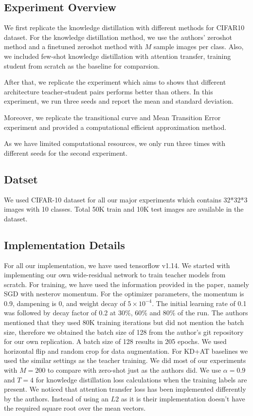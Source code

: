 \documentclass{article}
\begin{document}
\subsection{Experiment Overview}
We first replicate the knowledge distillation with different methods for CIFAR10 dataset. For the knowledge distillation method, we use the authors' zeroshot method and a finetuned zeroshot method with $M$ sample images per class. Also, we included few-shot knowledge distillation with attention transfer, training student from scratch as the baseline for comparsion.

After that, we replicate the experiment which aims to shows that different architecture teacher-student pairs performs better than others. In this experiment, we run three seeds and report the mean and standard deviation.

Moreover, we replicate the transitional curve and Mean Transition Error experiment and provided a computational efficient approximation method.

As we have limited computational resources, we only run three times with different seeds for the second experiment.

\subsection{Datset}

We used CIFAR-10 \cite{cifar10} dataset for all our major experiments which contains 32*32*3 images with 10 classes. Total 50K train and 10K test images are available in the dataset.

\subsection{Implementation Details}

For all our implementation, we have used tensorflow v1.14. We started with implementing our own wide-residual network \cite{zagoruyko2016wide} to train teacher models from scratch. For training, we have used the information provided in the paper, namely SGD with nesterov momentum. For the optimizer parameters, the momentum is 0.9, dampening is 0, and weight decay of $5\times10^{-4}$. \cite{zagoruyko2016wide} The initial learning rate of 0.1 was followed by decay factor of 0.2 at 30\%, 60\% and 80\% of the run. The authors mentioned that they used 80K training iterations but did not mention the batch size, therefore we obtained the batch size of 128 from the author's git repository for our own replication. A batch size of 128 results in 205 epochs. We used horizontal flip and random crop for data augmentation. \cite{zagoruyko2016wide} For KD+AT baselines we used the similar settings as the teacher training. We did most of our experiments with $M=200$ to compare with zero-shot just as the authors did. We use $\alpha=0.9$ and $T = 4$ for knowledge distillation loss calculations when the training labels are present. We noticed that attention transfer loss has been implemented differently by the authors. Instead of using an $L2$ as it is their implementation doesn't have the required square root over the mean vectors.
\end{document}
